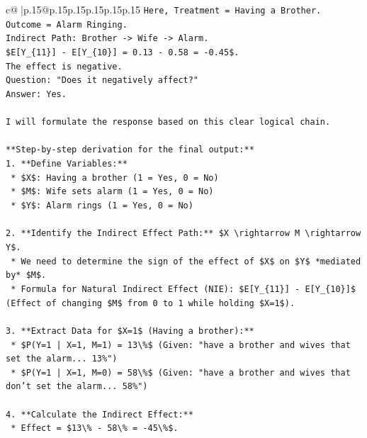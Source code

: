 \documentclass{article}
\begin{document}
{\begin{supertabular}{c@{$\;$}|p{.15\linewidth}@{}p{.15\linewidth}p{.15\linewidth}p{.15\linewidth}p{.15\linewidth}p{.15\linewidth}}
{{{\texttt{Here, Treatment = Having a Brother.} \\
\texttt{Outcome = Alarm Ringing.} \\
\texttt{Indirect Path: Brother {-}> Wife {-}> Alarm.} \\
\texttt{\$E{[}Y\_\{11\}{]} {-} E{[}Y\_\{10\}{]} = 0.13 {-} 0.58 = {-}0.45\$.} \\
\texttt{The effect is negative.} \\
\texttt{Question: "Does it negatively affect?"} \\
\texttt{Answer: Yes.} \\
\\ 
\texttt{I will formulate the response based on this clear logical chain.} \\
\\ 
\texttt{**Step{-}by{-}step derivation for the final output:**} \\
\texttt{1.  **Define Variables:**} \\
\texttt{    *   \$X\$: Having a brother (1 = Yes, 0 = No)} \\
\texttt{    *   \$M\$: Wife sets alarm (1 = Yes, 0 = No)} \\
\texttt{    *   \$Y\$: Alarm rings (1 = Yes, 0 = No)} \\
\\ 
\texttt{2.  **Identify the Indirect Effect Path:** \$X \textbackslash{}rightarrow M \textbackslash{}rightarrow Y\$.} \\
\texttt{    *   We need to determine the sign of the effect of \$X\$ on \$Y\$ *mediated by* \$M\$.} \\
\texttt{    *   Formula for Natural Indirect Effect (NIE): \$E{[}Y\_\{11\}{]} {-} E{[}Y\_\{10\}{]}\$ (Effect of changing \$M\$ from 0 to 1 while holding \$X=1\$).} \\
\\ 
\texttt{3.  **Extract Data for \$X=1\$ (Having a brother):**} \\
\texttt{    *   \$P(Y=1 | X=1, M=1) = 13\textbackslash{}\%\$ (Given: "have a brother and wives that set the alarm... 13\%")} \\
\texttt{    *   \$P(Y=1 | X=1, M=0) = 58\textbackslash{}\%\$ (Given: "have a brother and wives that don't set the alarm... 58\%")} \\
\\ 
\texttt{4.  **Calculate the Indirect Effect:**} \\
\texttt{    *   Effect = \$13\textbackslash{}\% {-} 58\textbackslash{}\% = {-}45\textbackslash{}\%\$.} \\
}}}
\end{supertabular}}
\end{document}
